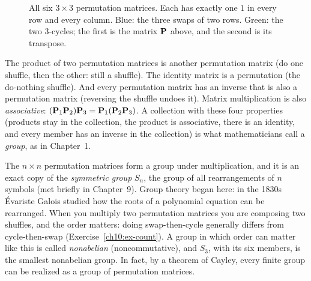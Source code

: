 \begin{figure}[htbp]
\centering
{}
\caption{All six $3\times 3$ permutation matrices. Each has exactly one $1$ in every row and every
column. Blue: the three swaps of two rows. Green: the two $3$-cycles; the first is the matrix
$\mathbf{P}$ above, and the second is its transpose.}
\label{ch10:fig-six-perms}
\end{figure}

The product of two permutation matrices is another permutation matrix (do one shuffle, then the
other: still a shuffle). The identity matrix is a permutation (the do-nothing shuffle). And every
permutation matrix has an inverse that is also a permutation matrix (reversing the shuffle undoes it).
Matrix multiplication is also \emph{associative}: $(\mathbf{P}_1\mathbf{P}_2)\mathbf{P}_3=\mathbf{P}_1(\mathbf{P}_2\mathbf{P}_3)$.
A collection with these four properties (products stay in the collection, the product is associative,
there is an identity, and every member has an inverse in the collection) is what mathematicians call
a \emph{group}, as in Chapter~1.

\begin{connectionbox}
The $n\times n$ permutation matrices form a group under multiplication, and it is an exact copy of
the \emph{symmetric group} $S_n$, the group of all rearrangements of $n$ symbols (met briefly in
Chapter~9). Group theory began here: in the 1830s \'Evariste Galois studied how the roots of a
polynomial equation can be rearranged. When you multiply two permutation matrices you are
composing two shuffles, and the order matters: doing swap-then-cycle generally differs from
cycle-then-swap (Exercise~\ref{ch10:ex-count}). A group in which order can matter like this is
called \emph{nonabelian} (noncommutative), and $S_3$, with its six members, is the smallest
nonabelian group. In fact, by a theorem of Cayley, every finite group can be realized as a group of
permutation matrices.
\end{connectionbox}

